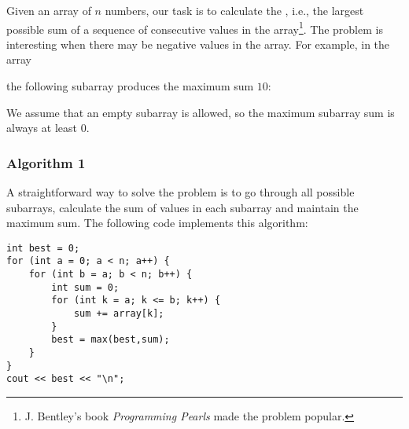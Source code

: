 Given an array of $n$ numbers,
our task is to calculate the
, i.e.,
the largest possible sum of 
a sequence of consecutive values
in the array\footnote{J. Bentley's
book \emph{Programming Pearls} \cite{ben86} made the problem popular.}.
The problem is interesting when there may be
negative values in the array.
For example, in the array
\begin{center}
\end{center}
\begin{samepage}
the following subarray produces the maximum sum $10$:
\begin{center}
\end{center}
\end{samepage}

We assume that an empty subarray is allowed,
so the maximum subarray sum is always at least $0$.

\subsubsection{Algorithm 1}

A straightforward way to solve the problem
is to go through all possible subarrays,
calculate the sum of values in each subarray and maintain
the maximum sum.
The following code implements this algorithm:

\begin{lstlisting}
int best = 0;
for (int a = 0; a < n; a++) {
    for (int b = a; b < n; b++) {
        int sum = 0;
        for (int k = a; k <= b; k++) {
            sum += array[k];
        }
        best = max(best,sum);
    }
}
cout << best << "\n";
\end{lstlisting}

